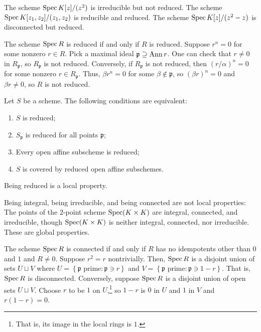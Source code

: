 \documentclass [11 pt, oneside] {article}
\begin{document}
\begin{example}[ ]\label{}\text{}
The scheme $\operatorname{Spec} K[z]/(z^2)$ is irreducible but not reduced. The scheme $\operatorname{Spec} K[z_1,z_2]/(z_1,z_2)$ is reducible and reduced. The scheme $\operatorname{Spec} K[z]/(z^2-z)$ is disconnected but reduced.
\end{example}

The scheme $\operatorname{Spec} R$ is reduced if and only if $R$ is reduced. Suppose $r^n =0$ for some nonzero $r\in R$. Pick a maximal ideal $\mathfrak{p}\supseteq \operatorname{Ann} r$. One can check that $r\ne 0$ in $R_{\mathfrak{p}}$, so $R_{\mathfrak{p}}$ is not reduced. Conversely, if $R_{\mathfrak{p}}$ is not reduced, then $(r/\alpha)^n=0$ for some nonzero $r\in R_{\mathfrak{p}}$. Thus, $\beta r^n =0$ for some $\beta\notin \mathfrak{p}$, so $(\beta r)^n=0$ and $\beta r\ne 0$, so $R$ is not reduced. 

\begin{proposition}[ ]\label{}\text{}
Let $S$ be a scheme. The following conditions are equivalent:
\begin{enumerate}
	\item $S$ is reduced;
	\item $S_{\mathfrak{p}}$ is reduced for all points $\mathfrak{p}$;
	\item Every open affine subscheme is reduced;
	\item $S$ is covered by reduced open affine subschemes.
\end{enumerate}
\end{proposition}

\begin{remark}
	Being reduced is a local property.
\end{remark}

\begin{remark}
	Being integral, being irreducible, and being connected are not local properties: The points of the $2$-point scheme $\operatorname{Spec} (K\times K)$ are integral, connected, and irreducible, though $\operatorname{Spec}(K\times K)$ is neither integral, connected, nor irreducible. These are global properties.
\end{remark}

The scheme $\operatorname{Spec} R$ is connected if and only if $R$ has no idempotents other than $0$ and $1$ and $R\ne 0$. Suppose $r^2 = r$ nontrivially. Then, $\operatorname{Spec} R$ is a disjoint union of sets $U\sqcup V$ where $U = \left\{ \textrm{$\mathfrak{p}$ prime}: \mathfrak{p}\ni r \right\} $ and $V = \left\{\textrm{$\mathfrak{p}$ prime}: \mathfrak{p} \ni 1-r \right\}$. That is, $\operatorname{Spec} R$ is disconnected. Conversely, suppose $\operatorname{Spec} R$ is a disjoint union of open sets $U\sqcup V$. Choose $r$ to be $1$ on $U$,\footnote{That is, its image in the local rings is $1$.} so $1-r$ is $0$ in $U$ and $1$ in $V$ and $r(1-r)=0$.
\end{document}
